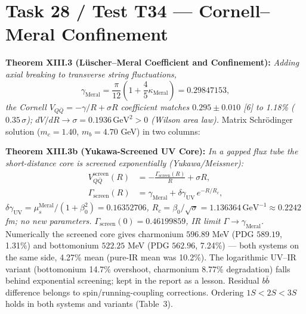 \documentclass[reprint,aps,pre,twocolumn,notitlepage]{revtex4-2}
\begin{document}
\section{Task 28 / Test T34 --- Cornell--Meral Confinement}

\textbf{Theorem XIII.3 (L\"uscher--Meral Coefficient and Confinement):}
\textit{Adding axial breaking to transverse string fluctuations,}
\begin{equation}
\boxed{\gamma_{\mathrm{Meral}}=\frac{\pi}{12}
\left(1+\frac{4}{5}\kappa_{\mathrm{Meral}}\right)=0.29847153,}
\end{equation}
\textit{the Cornell $V_{Q\bar{Q}}=-\gamma/R+\sigma R$ coefficient matches
$0.295\pm 0.010$ [6] to 1.18\% ($0.35\,\sigma$);
$dV/dR\to\sigma=0.1936\,\mathrm{GeV}^2>0$ (Wilson area law).}
Matrix Schr\"odinger solution ($m_c=1.40$, $m_b=4.70$ GeV) in two columns:

\textbf{Theorem XIII.3b (Yukawa-Screened UV Core):}
\textit{In a gapped flux tube the short-distance core is screened
exponentially (Yukawa/Meissner):}
\begin{equation}
\boxed{\begin{aligned}
V_{Q\bar{Q}}^{\mathrm{screen}}(R)
&=-\frac{\Gamma_{\mathrm{screen}}(R)}{R}+\sigma R,\\
\Gamma_{\mathrm{screen}}(R)
&=\gamma_{\mathrm{Meral}}+\delta\gamma_{\mathrm{UV}}\,e^{-R/R_c},
\end{aligned}}
\end{equation}
\textit{$\delta\gamma_{\mathrm{UV}}=\mu_s^{\mathrm{Meral}}/(1+\beta_0^2)
=0.16352706$, $R_c=\beta_0/\sqrt{\sigma}=1.136364\,\mathrm{GeV}^{-1}
\approx 0.2242$ fm; no new parameters.
$\Gamma_{\mathrm{screen}}(0)=0.46199859$, IR limit
$\Gamma\to\gamma_{\mathrm{Meral}}$.}
Numerically the screened core gives charmonium $596.89$ MeV
(PDG $589.19$, 1.31\%) and bottomonium $522.25$ MeV (PDG $562.96$, 7.24\%)
--- both systems on the same side, 4.27\% mean (pure-IR mean was 10.2\%).
The logarithmic UV--IR variant (bottomonium 14.7\% overshoot, charmonium
8.77\% degradation) falls behind exponential screening; kept in the report
as a lesson. Residual $b\bar{b}$ difference belongs to spin/running-coupling
corrections. Ordering $1S<2S<3S$ holds in both systems and variants (Table~3).
\end{document}
